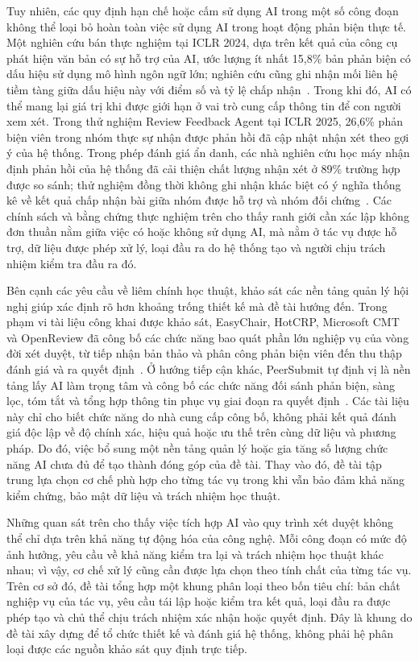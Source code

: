 Tuy nhiên, các quy định hạn chế hoặc cấm sử dụng AI trong một số công đoạn không thể loại bỏ hoàn toàn việc sử dụng AI trong hoạt động phản biện thực tế. Một nghiên cứu bán thực nghiệm tại ICLR 2024, dựa trên kết quả của công cụ phát hiện văn bản có sự hỗ trợ của AI, ước lượng ít nhất 15,8\% bản phản biện có dấu hiệu sử dụng mô hình ngôn ngữ lớn; nghiên cứu cũng ghi nhận mối liên hệ tiềm tàng giữa dấu hiệu này với điểm số và tỷ lệ chấp nhận~\cite{ch1ref14}. Trong khi đó, AI có thể mang lại giá trị khi được giới hạn ở vai trò cung cấp thông tin để con người xem xét. Trong thử nghiệm Review Feedback Agent tại ICLR 2025, 26,6\% phản biện viên trong nhóm thực sự nhận được phản hồi đã cập nhật nhận xét theo gợi ý của hệ thống. Trong phép đánh giá ẩn danh, các nhà nghiên cứu học máy nhận định phản hồi của hệ thống đã cải thiện chất lượng nhận xét ở 89\% trường hợp được so sánh; thử nghiệm đồng thời không ghi nhận khác biệt có ý nghĩa thống kê về kết quả chấp nhận bài giữa nhóm được hỗ trợ và nhóm đối chứng~\cite{ch1ref3,ch2ref18}. Các chính sách và bằng chứng thực nghiệm trên cho thấy ranh giới cần xác lập không đơn thuần nằm giữa việc có hoặc không sử dụng AI, mà nằm ở tác vụ được hỗ trợ, dữ liệu được phép xử lý, loại đầu ra do hệ thống tạo và người chịu trách nhiệm kiểm tra đầu ra đó.

Bên cạnh các yêu cầu về liêm chính học thuật, khảo sát các nền tảng quản lý hội nghị giúp xác định rõ hơn khoảng trống thiết kế mà đề tài hướng đến. Trong phạm vi tài liệu công khai được khảo sát, EasyChair, HotCRP, Microsoft CMT và OpenReview đã công bố các chức năng bao quát phần lớn nghiệp vụ của vòng đời xét duyệt, từ tiếp nhận bản thảo và phân công phản biện viên đến thu thập đánh giá và ra quyết định~\cite{ch1ref5,ch1ref6,ch1ref7,ch1ref8,ch2ref1}. Ở hướng tiếp cận khác, PeerSubmit tự định vị là nền tảng lấy AI làm trọng tâm và công bố các chức năng đối sánh phản biện, sàng lọc, tóm tắt và tổng hợp thông tin phục vụ giai đoạn ra quyết định~\cite{ch2ref48,ch2ref52}. Các tài liệu này chỉ cho biết chức năng do nhà cung cấp công bố, không phải kết quả đánh giá độc lập về độ chính xác, hiệu quả hoặc ưu thế trên cùng dữ liệu và phương pháp. Do đó, việc bổ sung một nền tảng quản lý hoặc gia tăng số lượng chức năng AI chưa đủ để tạo thành đóng góp của đề tài. Thay vào đó, đề tài tập trung lựa chọn cơ chế phù hợp cho từng tác vụ trong khi vẫn bảo đảm khả năng kiểm chứng, bảo mật dữ liệu và trách nhiệm học thuật.

Những quan sát trên cho thấy việc tích hợp AI vào quy trình xét duyệt không thể chỉ dựa trên khả năng tự động hóa của công nghệ. Mỗi công đoạn có mức độ ảnh hưởng, yêu cầu về khả năng kiểm tra lại và trách nhiệm học thuật khác nhau; vì vậy, cơ chế xử lý cũng cần được lựa chọn theo tính chất của từng tác vụ. Trên cơ sở đó, đề tài tổng hợp một khung phân loại theo bốn tiêu chí: bản chất nghiệp vụ của tác vụ, yêu cầu tái lập hoặc kiểm tra kết quả, loại đầu ra được phép tạo và chủ thể chịu trách nhiệm xác nhận hoặc quyết định. Đây là khung do đề tài xây dựng để tổ chức thiết kế và đánh giá hệ thống, không phải hệ phân loại được các nguồn khảo sát quy định trực tiếp.

